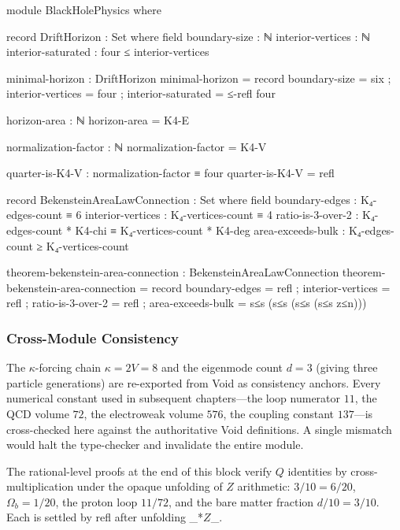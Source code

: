 \documentclass[11pt,a4paper]{book}
\def\mathbb#1{#1}%
\def\texttt#1{#1}%
\begin{document}
\begin{code}

module BlackHolePhysics where

  record DriftHorizon : Set where
    field
      boundary-size : ℕ
      interior-vertices : ℕ
      interior-saturated : four ≤ interior-vertices

  minimal-horizon : DriftHorizon
  minimal-horizon = record
    { boundary-size = six
    ; interior-vertices = four
    ; interior-saturated = ≤-refl four }

  horizon-area : ℕ
  horizon-area = K4-E

  normalization-factor : ℕ
  normalization-factor = K4-V

  quarter-is-K4-V : normalization-factor ≡ four
  quarter-is-K4-V = refl

record BekensteinAreaLawConnection : Set where
  field
    boundary-edges : K₄-edges-count ≡ 6
    interior-vertices : K₄-vertices-count ≡ 4
    ratio-is-3-over-2 : K₄-edges-count * K4-chi ≡ K₄-vertices-count * K4-deg
    area-exceeds-bulk : K₄-edges-count ≥ K₄-vertices-count

theorem-bekenstein-area-connection : BekensteinAreaLawConnection
theorem-bekenstein-area-connection = record
  { boundary-edges = refl
  ; interior-vertices = refl
  ; ratio-is-3-over-2 = refl
  ; area-exceeds-bulk = s≤s (s≤s (s≤s (s≤s z≤n))) }
\end{code}

\subsubsection*{Cross-Module Consistency}

The $\kappa$-forcing chain $\kappa = 2V = 8$ and the eigenmode count
$d = 3$ (giving three particle generations) are re-exported from Void
as consistency anchors.  Every numerical constant used in subsequent
chapters---the loop numerator $11$, the QCD volume $72$, the electroweak
volume $576$, the coupling constant $137$---is cross-checked here against
the authoritative Void definitions.  A single mismatch would halt the
type-checker and invalidate the entire module.

The rational-level proofs at the end of this block verify $\mathbb{Q}$
identities by cross-multiplication under the opaque unfolding of
$\mathbb{Z}$ arithmetic: $3/10 = 6/20$, $\Omega_b = 1/20$,
the proton loop $11/72$, and the bare matter fraction $d/10 = 3/10$.
Each is settled by \texttt{refl} after unfolding \texttt{\_*$\mathbb{Z}$\_}.
\end{document}
